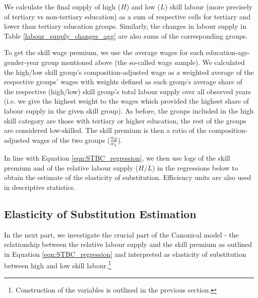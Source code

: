 \documentclass[11pt]{article}
\begin{document}
We calculate the final supply of high ($H$) and low ($L$) skill labour (more precisely of tertiary vs non-tertiary education) as a sum of respective cells for tertiary and lower than tertiary education groups. Similarly, the changes in labour supply in Table \ref{labour_supply_changes_agg} are also sums of the corresponding groups.

To get the skill wage premium, we use the average wages for each education-age-gender-year group mentioned above (the so-called wage sample). We calculated the high/low skill group's composition-adjusted wage as a weighted average of the respective groups' wages with weights defined as each group's average share of the respective (high/low) skill group's total labour supply over all observed years (i.e. we give the highest weight to the wages which provided the highest share of labour supply in the given skill group). As before, the groups included in the high skill category are those with tertiary or higher education, the rest of the groups are considered low-skilled. The skill premium is then a ratio of the composition-adjusted wages of the two groups ($\frac{w_H}{w_L}$).


In line with Equation \ref{eqn:STBC_regression}, we then use logs of the skill premium and of the relative labour supply ($H/L$) in the regressions below to obtain the estimate of the elasticity of substitution. Efficiency units are also used in descriptive statistics.



\subsection{Elasticity of Substitution Estimation}
In the next part, we investigate the crucial part of the Canonical model - the relationship between the relative labour supply and the skill premium as outlined in Equation \ref{eqn:STBC_regression} and interpreted as elasticity of substitution between high and low skill labour.\footnote{Construction of the variables is outlined in the previous section.} 
\end{document}
